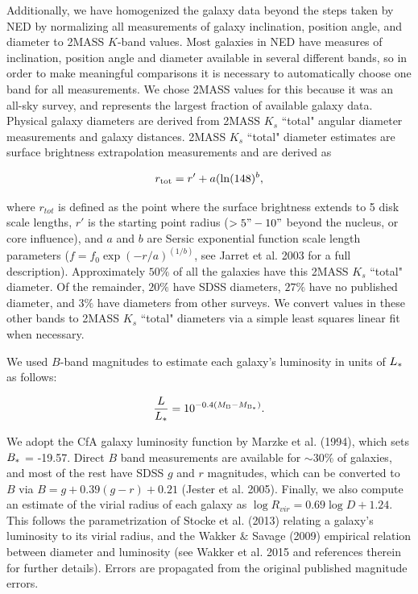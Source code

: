 \documentclass[twocolumn,tighten]{aastex6}
\begin{document}
Additionally, we have homogenized the galaxy data beyond the steps taken by NED by normalizing all measurements of galaxy inclination, position angle, and diameter to 2MASS $K$-band values. Most galaxies in NED have measures of inclination, position angle and diameter available in several different bands, so in order to make meaningful comparisons it is necessary to automatically choose one band for all measurements. We chose 2MASS values for this because it was an all-sky survey, and represents the largest fraction of available galaxy data. Physical galaxy diameters are derived from 2MASS $K_{s}$ ``total" angular diameter measurements and galaxy distances. 2MASS $K_{s}$ ``total" diameter estimates are surface brightness extrapolation measurements and are derived as 

\begin{equation}
r_{\rm tot} = r' + a(\ln(148)^b,
\end{equation}

\noindent where $r_{tot}$ is defined as the point where the surface brightness extends to 5 disk scale lengths, $r'$ is the starting point radius ($>5" - 10"$ beyond the nucleus, or core influence), and $a$ and $b$ are Sersic exponential function scale length parameters ($f = f_0 \exp{(-r/a)}^{(1/b)}$, see Jarret et al. 2003 for a full description). Approximately $50\%$ of all the galaxies have this 2MASS $K_{s}$ ``total" diameter. Of the remainder, $20\%$ have SDSS diameters, $27\%$ have no published diameter, and $3\%$ have diameters from other surveys. We convert values in these other bands to 2MASS $K_{s}$ ``total" diameters via a simple least squares linear fit when necessary.

We used $B$-band magnitudes to estimate each galaxy's luminosity in units of $L_{\**}$ as follows:

\begin{equation}
	\frac{L}{L_{\**}} = 10^{-0.4 (M_{\rm B} - M_{\rm B_{\**}})}.
\end{equation}

We adopt the CfA galaxy luminosity function by Marzke et al. (1994), which sets $B_{\**} $ = -19.57. Direct $B$ band measurements are available for $\sim 30\%$ of galaxies, and most of the rest have SDSS $g$ and $r$ magnitudes, which can be converted to $B$ via $B = g + 0.39 (g-r) + 0.21$ (Jester et al. 2005). Finally, we also compute an estimate of the virial radius of each galaxy as $\log R_{vir} = 0.69 \log D + 1.24$. This follows the parametrization of Stocke et al. (2013) relating a galaxy's luminosity to its virial radius, and the Wakker $\&$ Savage (2009) empirical relation between diameter and luminosity (see Wakker et al. 2015 and references therein for further details). Errors are propagated from the original published magnitude errors.
\end{document}
